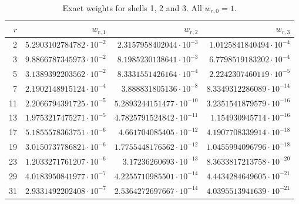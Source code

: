 \begin{table}[htbp]
\centering\scriptsize
\caption{Exact weights for shells 1, 2 and 3. All $w_{r,0}=1$.}
\label{tab:weights123}
\begin{tabular}{rrrr}
\toprule
$r$ & $w_{r,1}$ & $w_{r,2}$ & $w_{r,3}$\\
\midrule
2 & $5.2903102784782\cdot10^{-2}$ & $2.3157958402044\cdot10^{-3}$ & $1.0125841840494\cdot10^{-4}$\\
3 & $9.8866787345973\cdot10^{-2}$ & $8.1985230138641\cdot10^{-3}$ & $6.7798519183202\cdot10^{-4}$\\
5 & $3.1389392203562\cdot10^{-2}$ & $8.3331551426164\cdot10^{-4}$ & $2.2242307460119\cdot10^{-5}$\\
7 & $2.1902148915124\cdot10^{-4}$ & $3.888831805136\cdot10^{-8}$ & $8.3349312286089\cdot10^{-14}$\\
11 & $2.2066794391725\cdot10^{-5}$ & $5.2893244151477\cdot10^{-10}$ & $3.2351541879579\cdot10^{-16}$\\
13 & $1.9753217475271\cdot10^{-5}$ & $4.7825791524842\cdot10^{-11}$ & $1.154930945714\cdot10^{-16}$\\
17 & $5.1855578363751\cdot10^{-6}$ & $4.661704085405\cdot10^{-12}$ & $4.1907708339914\cdot10^{-18}$\\
19 & $3.0150737786821\cdot10^{-6}$ & $1.7755448176562\cdot10^{-12}$ & $1.0455994096796\cdot10^{-18}$\\
23 & $1.2033271761207\cdot10^{-6}$ & $3.17236260693\cdot10^{-13}$ & $8.3633817213758\cdot10^{-20}$\\
29 & $4.0183950841977\cdot10^{-7}$ & $4.2255710985501\cdot10^{-14}$ & $4.4434284649605\cdot10^{-21}$\\
31 & $2.9331492202408\cdot10^{-7}$ & $2.5364272697667\cdot10^{-14}$ & $4.0395513941639\cdot10^{-21}$\\
\bottomrule
\end{tabular}
\end{table}

